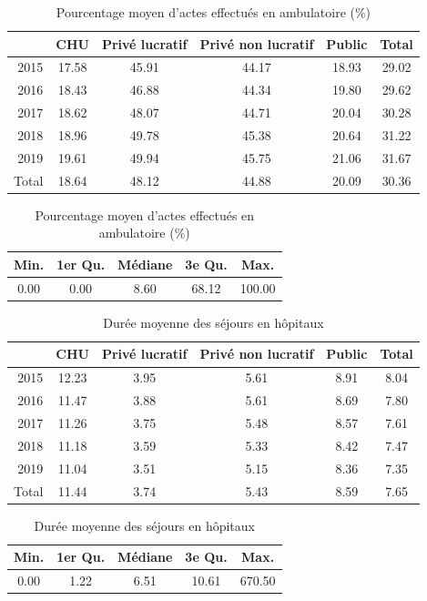\begin{table}[ht]
\centering
\caption{Pourcentage moyen d'actes effectués en ambulatoire (\%)} 
\label{part_ambu_tabu}
\begin{tabular}{r|cccc|c}
  \hline
 & CHU & Privé lucratif & Privé non lucratif & Public & Total \\ 
  \hline
2015 & 17.58 & 45.91 & 44.17 & 18.93 & 29.02 \\ 
  2016 & 18.43 & 46.88 & 44.34 & 19.80 & 29.62 \\ 
  2017 & 18.62 & 48.07 & 44.71 & 20.04 & 30.28 \\ 
  2018 & 18.96 & 49.78 & 45.38 & 20.64 & 31.22 \\ 
  2019 & 19.61 & 49.94 & 45.75 & 21.06 & 31.67 \\ 
  \hline
  Total & 18.64 & 48.12 & 44.88 & 20.09 & 30.36 \\ 
   \hline
\end{tabular}

\bigskip

\begin{tabular}{ccccc}
  \hline
Min. & 1er Qu. & Médiane & 3e Qu. & Max. \\ 
  \hline
0.00 & 0.00 & 8.60 & 68.12 & 100.00 \\ 
   \hline
\end{tabular}
\end{table}



\begin{table}[ht]
\centering
\caption{Durée moyenne des séjours en hôpitaux} 
\label{dms_tabu}
\begin{tabular}{r|cccc|c}
  \hline
 & CHU & Privé lucratif & Privé non lucratif & Public & Total \\ 
  \hline
2015 & 12.23 & 3.95 & 5.61 & 8.91 & 8.04 \\ 
  2016 & 11.47 & 3.88 & 5.61 & 8.69 & 7.80 \\ 
  2017 & 11.26 & 3.75 & 5.48 & 8.57 & 7.61 \\ 
  2018 & 11.18 & 3.59 & 5.33 & 8.42 & 7.47 \\ 
  2019 & 11.04 & 3.51 & 5.15 & 8.36 & 7.35 \\ 
  \hline
  Total & 11.44 & 3.74 & 5.43 & 8.59 & 7.65 \\ 
   \hline
\end{tabular}

\bigskip

\begin{tabular}{ccccc}
  \hline
Min. & 1er Qu. & Médiane & 3e Qu. & Max. \\ 
  \hline
0.00 & 1.22 & 6.51 & 10.61 & 670.50 \\ 
   \hline
\end{tabular}
\end{table}

